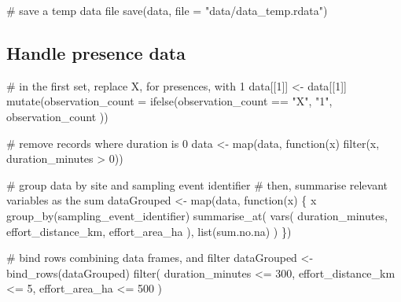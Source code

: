 \documentclass[]{article}
\newenvironment{Shaded}{}{}
\newcommand{\CommentTok}[1]{\textcolor[rgb]{0.00,0.50,0.00}{#1}}
\newcommand{\ControlFlowTok}[1]{\textcolor[rgb]{0.00,0.00,1.00}{#1}}
\newcommand{\DataTypeTok}[1]{#1}
\newcommand{\DecValTok}[1]{#1}
\newcommand{\KeywordTok}[1]{\textcolor[rgb]{0.00,0.00,1.00}{#1}}
\newcommand{\NormalTok}[1]{#1}
\newcommand{\OperatorTok}[1]{#1}
\newcommand{\StringTok}[1]{\textcolor[rgb]{0.00,0.50,0.50}{#1}}
\begin{document}
\begin{Shaded}
\begin{Highlighting}[]
\CommentTok{# save a temp data file}
\KeywordTok{save}\NormalTok{(data, }\DataTypeTok{file =} \StringTok{"data/data_temp.rdata"}\NormalTok{)}
\end{Highlighting}
\end{Shaded}

\hypertarget{handle-presence-data}{%
\subsection{Handle presence data}\label{handle-presence-data}}

\begin{Shaded}
\begin{Highlighting}[]

\CommentTok{# in the first set, replace X, for presences, with 1}
\NormalTok{data[[}\DecValTok{1}\NormalTok{]] <-}\StringTok{ }\NormalTok{data[[}\DecValTok{1}\NormalTok{]] }\OperatorTok{%
\StringTok{  }\KeywordTok{mutate}\NormalTok{(}\DataTypeTok{observation_count =} \KeywordTok{ifelse}\NormalTok{(observation_count }\OperatorTok{==}\StringTok{ "X"}\NormalTok{,}
    \StringTok{"1"}\NormalTok{, observation_count}
\NormalTok{  ))}

\CommentTok{# remove records where duration is 0}
\NormalTok{data <-}\StringTok{ }\KeywordTok{map}\NormalTok{(data, }\ControlFlowTok{function}\NormalTok{(x) }\KeywordTok{filter}\NormalTok{(x, duration_minutes }\OperatorTok{>}\StringTok{ }\DecValTok{0}\NormalTok{))}

\CommentTok{# group data by site and sampling event identifier}
\CommentTok{# then, summarise relevant variables as the sum}
\NormalTok{dataGrouped <-}\StringTok{ }\KeywordTok{map}\NormalTok{(data, }\ControlFlowTok{function}\NormalTok{(x) \{}
\NormalTok{  x }\OperatorTok{%
\StringTok{    }\KeywordTok{group_by}\NormalTok{(sampling_event_identifier) }\OperatorTok{%
\StringTok{    }\KeywordTok{summarise_at}\NormalTok{(}
      \KeywordTok{vars}\NormalTok{(}
\NormalTok{        duration_minutes, effort_distance_km,}
\NormalTok{        effort_area_ha}
\NormalTok{      ),}
      \KeywordTok{list}\NormalTok{(sum.no.na)}
\NormalTok{    )}
\NormalTok{\})}

\CommentTok{# bind rows combining data frames, and filter}
\NormalTok{dataGrouped <-}\StringTok{ }\KeywordTok{bind_rows}\NormalTok{(dataGrouped) }\OperatorTok{%
\StringTok{  }\KeywordTok{filter}\NormalTok{(}
\NormalTok{    duration_minutes }\OperatorTok{<=}\StringTok{ }\DecValTok{300}\NormalTok{,}
\NormalTok{    effort_distance_km }\OperatorTok{<=}\StringTok{ }\DecValTok{5}\NormalTok{,}
\NormalTok{    effort_area_ha }\OperatorTok{<=}\StringTok{ }\DecValTok{500}
\NormalTok{  )}

}}}}
\end{Highlighting}
\end{Shaded}
\end{document}
